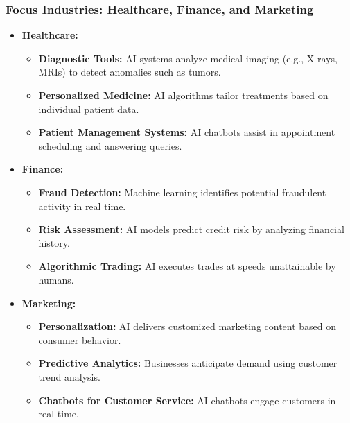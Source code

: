 \documentclass{beamer}
\begin{document}
\begin{frame}[fragile]
    \frametitle{Focus Industries: Healthcare, Finance, and Marketing}
    \begin{itemize}
        \item \textbf{Healthcare:}
        \begin{itemize}
            \item \textbf{Diagnostic Tools:} AI systems analyze medical imaging (e.g., X-rays, MRIs) to detect anomalies such as tumors.
            \item \textbf{Personalized Medicine:} AI algorithms tailor treatments based on individual patient data.
            \item \textbf{Patient Management Systems:} AI chatbots assist in appointment scheduling and answering queries.
        \end{itemize}
        
        \item \textbf{Finance:}
        \begin{itemize}
            \item \textbf{Fraud Detection:} Machine learning identifies potential fraudulent activity in real time.
            \item \textbf{Risk Assessment:} AI models predict credit risk by analyzing financial history.
            \item \textbf{Algorithmic Trading:} AI executes trades at speeds unattainable by humans.
        \end{itemize}
        
        \item \textbf{Marketing:}
        \begin{itemize}
            \item \textbf{Personalization:} AI delivers customized marketing content based on consumer behavior.
            \item \textbf{Predictive Analytics:} Businesses anticipate demand using customer trend analysis.
            \item \textbf{Chatbots for Customer Service:} AI chatbots engage customers in real-time.
        \end{itemize}
    \end{itemize}
\end{frame}
\end{document}
